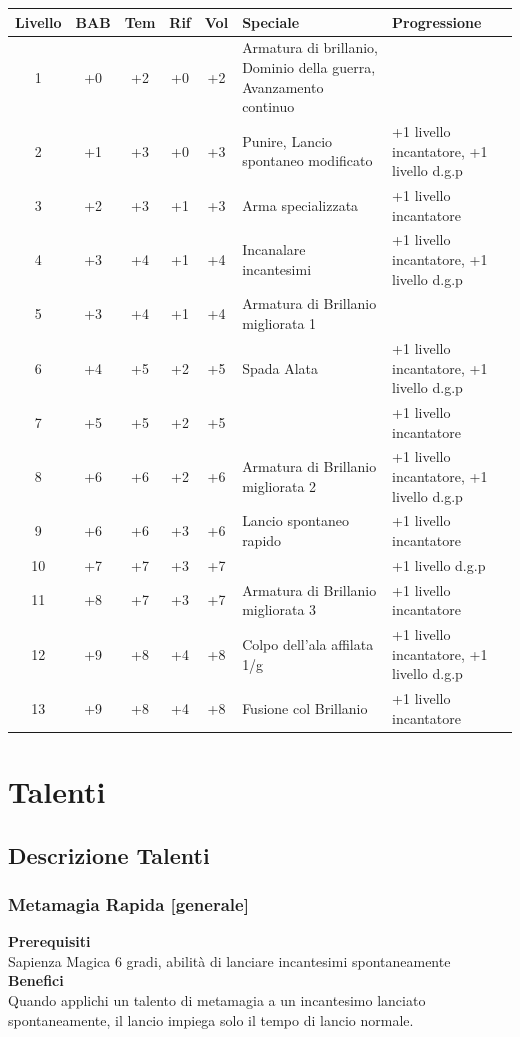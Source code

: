 \documentclass[10pt, a4paper]{report}
\begin{document}
\hspace{-1.25cm}
{\sffamily
\begin{tabular}{|c|c|c|c|c|p{6cm}|p{6cm}|}
\hline
\textbf{Livello} & \textbf{BAB} & \textbf{Tem} & \textbf{Rif} & \textbf{Vol} & \textbf{Speciale} & \textbf{Progressione} \\ 
\hline
1  & +0 & +2 & +0 & +2 & Armatura di brillanio, Dominio della guerra, Avanzamento continuo &  \\ 
\hline
2  & +1 & +3 & +0 & +3 & Punire, Lancio spontaneo modificato & +1 livello incantatore, +1 livello d.g.p\\ 
\hline
3  & +2 & +3 & +1 & +3 & Arma specializzata & +1 livello incantatore \\ 
\hline
4  & +3 & +4 & +1 & +4 & Incanalare incantesimi & +1 livello incantatore, +1 livello d.g.p\\ 
\hline
5  & +3 & +4 & +1 & +4 & Armatura di Brillanio migliorata 1 &  \\ 
\hline
6  & +4 & +5 & +2 & +5 & Spada Alata & +1 livello incantatore, +1 livello d.g.p \\ 
\hline
7  & +5 & +5 & +2 & +5 &   & +1 livello incantatore \\ 
\hline
8  & +6 & +6 & +2 & +6 & Armatura di Brillanio migliorata 2 & +1 livello incantatore, +1 livello d.g.p \\ 
\hline
9  & +6 & +6 & +3 & +6 & Lancio spontaneo rapido & +1 livello incantatore \\ 
\hline
10 & +7 & +7 & +3 & +7 &   & +1 livello d.g.p \\ 
\hline
11 & +8 & +7 & +3 & +7 & Armatura di Brillanio migliorata 3 & +1 livello incantatore \\ 
\hline
12 & +9 & +8 & +4 & +8 & Colpo dell’ala affilata 1/g & +1 livello incantatore, +1 livello d.g.p \\ 
\hline
13 & +9 & +8 & +4 & +8 & Fusione col Brillanio & +1 livello incantatore \\ 
\hline
\end{tabular}
}

\chapter{Talenti}
\begin{multicols}{2}
\section{Descrizione Talenti}
\end{multicols}
\subsection{Metamagia Rapida [generale]}
\label{rapidmetamagic}
\textbf{Prerequisiti}\\
Sapienza Magica 6 gradi, abilità di lanciare incantesimi spontaneamente\\
\textbf{Benefici}\\
Quando applichi un talento di metamagia a un incantesimo lanciato spontaneamente, il lancio impiega solo il tempo di lancio normale.
\end{document}
